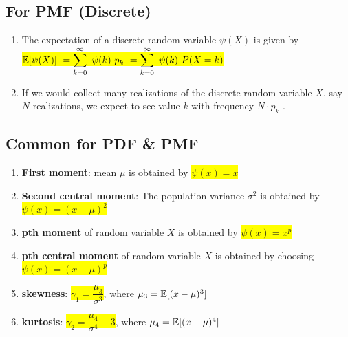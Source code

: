 \subsection{For PMF (Discrete)}

\begin{enumerate}
    \item The expectation of a discrete random variable $\psi(X)$ is given by
    \hfill \cite{statistics/book/Statistics-for-Data-Scientists/Maurits-Kaptein}
    \\[0.2cm]
    \colorbox{yellow}{$
        \mathbb{E}[\psi(X)] \
        = \displaystyle\sum^{\infty}_{k=0}\ \psi(k)\ p _k \
        = \displaystyle\sum^{\infty}_{k=0}\ \psi(k)\ P(X = k)
    $}
    \hfill \cite{statistics/book/Statistics-for-Data-Scientists/Maurits-Kaptein}

    \item If we would collect many realizations of the discrete random variable $X$, say $N$ realizations, we expect to see value $k$ with frequency $N \cdot p _k$ .
    \hfill \cite{statistics/book/Statistics-for-Data-Scientists/Maurits-Kaptein}
\end{enumerate}

\subsection{Common for PDF \& PMF}

\begin{enumerate}
    \item \textbf{First moment}: mean $\mu$ is obtained by \colorbox{yellow}{$\psi(x)=x$}
    \hfill \cite{statistics/book/Statistics-for-Data-Scientists/Maurits-Kaptein}

    \item \textbf{Second central moment}: The population variance $\sigma^ 2$ is obtained by \colorbox{yellow}{$\psi(x)=(x -\mu)^2$}
    \hfill \cite{statistics/book/Statistics-for-Data-Scientists/Maurits-Kaptein}

    \item \textbf{pth moment} of random variable $X$ is obtained by \colorbox{yellow}{$\psi(x) = x^p$}
    \hfill \cite{statistics/book/Statistics-for-Data-Scientists/Maurits-Kaptein}

    \item \textbf{pth central moment} of random variable $X$ is obtained by choosing \colorbox{yellow}{$\psi(x) = (x - \mu)^p$}
    \hfill \cite{statistics/book/Statistics-for-Data-Scientists/Maurits-Kaptein}

    \item \textbf{skewness}: \colorbox{yellow}{$\gamma_1 = \dfrac{\mu_3}{\sigma^3}$}, where $\mu_3 = \mathbb{E}[(x-\mu)^3]$
    \hfill \cite{statistics/book/Statistics-for-Data-Scientists/Maurits-Kaptein}

    \item \textbf{kurtosis}: \colorbox{yellow}{$\gamma_2 = \dfrac{\mu_4}{\sigma^4} - 3$}, where $\mu_4 = \mathbb{E}[(x-\mu)^4]$
    \hfill \cite{statistics/book/Statistics-for-Data-Scientists/Maurits-Kaptein}
\end{enumerate}

